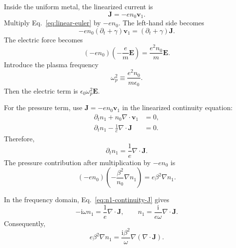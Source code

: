 \documentclass[11pt,a4paper]{article}
\newcommand{\E}{\mathbf E}
\newcommand{\J}{\mathbf J}
\newcommand{\ii}{\mathrm i}
\newcommand{\omegap}{\omega_p}
\begin{document}
Inside the uniform metal, the linearized current is
\begin{equation}
    \J=-e n_0\mathbf v_1.
    \label{eq:linear-current-velocity}
\end{equation}
Multiply Eq.~\eqref{eq:linear-euler} by \(-e n_0\).  The left-hand side
becomes
\begin{equation}
    -e n_0(\partial_t+\gamma)\mathbf v_1
    =(\partial_t+\gamma)\J.
    \label{eq:current-time-left}
\end{equation}
The electric force becomes
\begin{equation}
    (-e n_0)\left(-\frac{e}{m}\E\right)
    =\frac{e^2n_0}{m}\E.
    \label{eq:current-electric-force}
\end{equation}
Introduce the plasma frequency
\begin{equation}
    \omegap^2\equiv\frac{e^2n_0}{m\epsilon_0}.
    \label{eq:plasma-frequency}
\end{equation}
Then the electric term is \(\epsilon_0\omegap^2\E\).

For the pressure term, use \(\J=-en_0\mathbf v_1\) in the linearized
continuity equation:
\begin{align}
    \partial_t n_1+n_0\nabla\!\cdot\mathbf v_1&=0,\\
    \partial_t n_1-\frac{1}{e}\nabla\!\cdot\!\J&=0.
    \label{eq:n1-continuity-J}
\end{align}
Therefore,
\begin{equation}
    \partial_t n_1=\frac{1}{e}\nabla\!\cdot\!\J.
    \label{eq:n1-time-J}
\end{equation}
The pressure contribution after multiplication by \(-e n_0\) is
\begin{equation}
    (-e n_0)\left(-\frac{\beta^2}{n_0}\nabla n_1\right)
    =e\beta^2\nabla n_1.
    \label{eq:pressure-current-term}
\end{equation}

In the frequency domain, Eq.~\eqref{eq:n1-continuity-J} gives
\begin{equation}
    -\ii\omega n_1=\frac{1}{e}\nabla\!\cdot\!\J,
    \qquad
    n_1=\frac{\ii}{e\omega}\nabla\!\cdot\!\J.
    \label{eq:n1-frequency}
\end{equation}
Consequently,
\begin{equation}
    e\beta^2\nabla n_1
    =\frac{\ii\beta^2}{\omega}
      \nabla\!\left(\nabla\!\cdot\!\J\right).
    \label{eq:pressure-frequency-current}
\end{equation}
\end{document}
